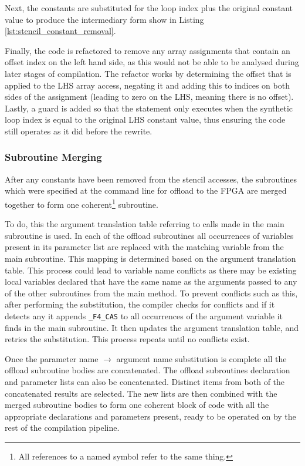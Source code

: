 \documentclass{mpaper}
\begin{document}
Next, the constants are substituted for the loop index plus the original constant value to produce the intermediary form show in Listing \ref{lst:stencil_constant_removal}.

Finally, the code is refactored to remove any array assignments that contain an offset index on the left hand side, as this would not be able to be analysed during later stages of compilation.
The refactor works by determining the offset that is applied to the LHS array access, negating it and adding this to indices on both sides of the assignment (leading to zero on the LHS, meaning there is no offset). 
Lastly, a guard is added so that the statement only executes when the synthetic loop index is equal to the original LHS constant value, thus ensuring the code still operates as it did before the rewrite. 

\subsubsection*{Subroutine Merging}

After any constants have been removed from the stencil accesses, the subroutines which were specified at the command line for offload to the FPGA are merged together to form one coherent\footnote{All references to a named symbol refer to the same thing.} subroutine.

To do, this the argument translation table referring to calls made in the main subroutine is used.
In each of the offload subroutines all occurrences of variables present in its parameter list are replaced with the matching variable from the main subroutine. 
This mapping is determined based on the argument translation table.
This process could lead to variable name conflicts as there may be existing local variables declared that have the same name as the arguments passed to any of the other subroutines from the main method.
To prevent conflicts such as this, after performing the substitution, the compiler checks for conflicts and if it detects any it appends \texttt{\_F4\_CAS} to all occurrences of the argument variable it finds in the main subroutine.
It then updates the argument translation table, and retries the substitution.
This process repeats until no conflicts exist. 

Once the parameter name $\rightarrow$ argument name substitution is complete all the offload subroutine bodies are concatenated. 
The offload subroutines declaration and parameter lists can also be concatenated.
Distinct items from both of the concatenated results are selected. 
The new lists are then combined with the merged subroutine bodies to form one coherent block of code with all the appropriate declarations and parameters present, ready to be operated on by the rest of the compilation pipeline.
\end{document}

